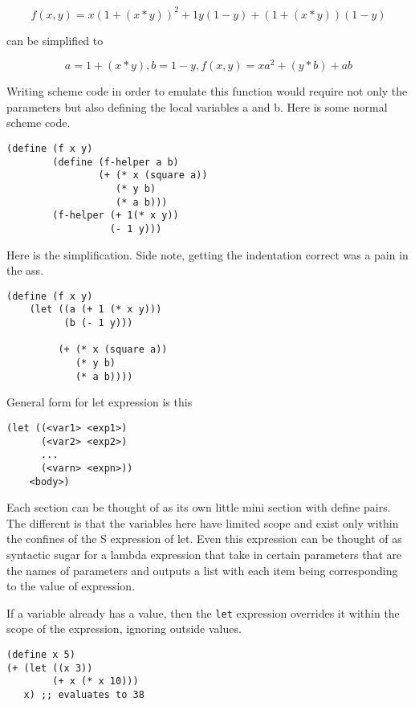 \documentclass[11pt]{article}
\begin{document}
\begin{equation}
f(x, y) = x(1 + (x * y))^2 + 1 y (1 - y) + ( 1 + (x * y))(1 - y)
\end{equation}

can be simplified to

\begin{equation}
a = 1 + (x * y),
b = 1 - y,
f(x, y) = xa^2 + (y * b) + ab
\end{equation}

Writing scheme code in order to emulate this function would require not
only the parameters but also defining the local variables a and b. Here
is some normal scheme code.

\begin{verbatim}
(define (f x y)
        (define (f-helper a b)
                (+ (* x (square a))
                   (* y b)
                   (* a b)))
        (f-helper (+ 1(* x y))
                  (- 1 y)))
\end{verbatim}

Here is the simplification. Side note, getting the indentation correct
was a pain in the ass.

\begin{verbatim}
(define (f x y)
    (let ((a (+ 1 (* x y)))
          (b (- 1 y)))

         (+ (* x (square a))
            (* y b)
            (* a b))))
\end{verbatim}

General form for let expression is this

\begin{verbatim}
(let ((<var1> <exp1>)
      (<var2> <exp2>)
      ...
      (<varn> <expn>))
    <body>)
\end{verbatim}

Each section can be thought of as its own little mini section with
define pairs. The different is that the variables here have limited
scope and exist only within the confines of the S expression of let.
Even this expression can be thought of as syntactic sugar for a lambda
expression that take in certain parameters that are the names of
parameters and outputs a list with each item being corresponding to the
value of expression.

If a variable already has a value, then the \texttt{let} expression overrides
it within the scope of the expression, ignoring outside values.

\begin{verbatim}
(define x 5)
(+ (let ((x 3))
        (+ x (* x 10)))
   x) ;; evaluates to 38
\end{verbatim}
\end{document}
